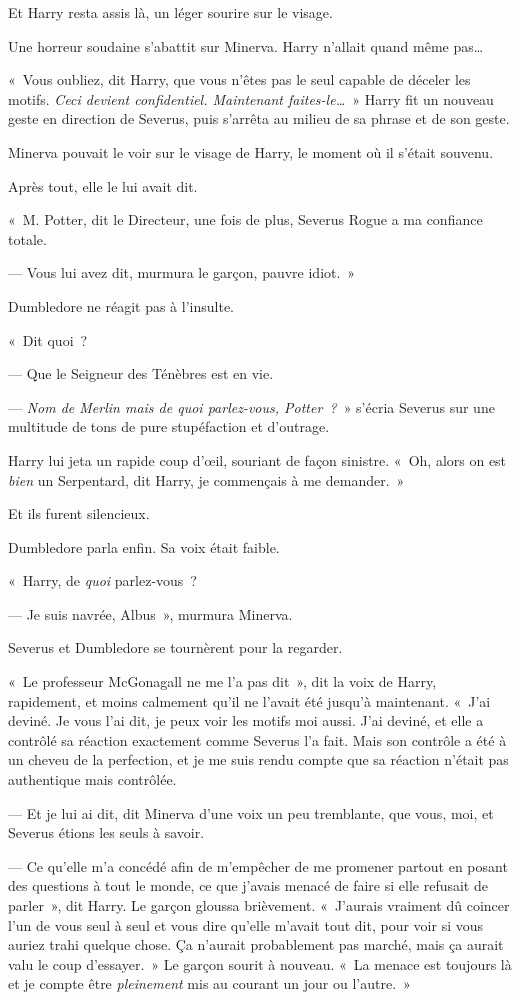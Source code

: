 Et Harry resta assis là, un léger sourire sur le visage.

Une horreur soudaine s'abattit sur Minerva.
Harry n'allait quand même pas…

«~Vous oubliez, dit Harry, que vous n'êtes pas le seul capable de déceler les motifs.
\emph{Ceci devient confidentiel.
Maintenant faites-le…}~» Harry fit un nouveau geste en direction de Severus, puis s'arrêta au milieu de sa phrase et de son geste.

Minerva pouvait le voir sur le visage de Harry, le moment où il s'était souvenu.

Après tout, elle le lui avait dit.

«~M. Potter, dit le Directeur, une fois de plus, Severus Rogue a ma confiance totale.

--- Vous lui avez dit, murmura le garçon, pauvre idiot.~»

Dumbledore ne réagit pas à l'insulte.

«~Dit quoi~?

--- Que le Seigneur des Ténèbres est en vie.

--- \emph{Nom de Merlin mais de quoi parlez-vous, Potter~?}~» s'écria Severus sur une multitude de tons de pure stupéfaction et d'outrage.

Harry lui jeta un rapide coup d'œil, souriant de façon sinistre.
«~Oh, alors on est \emph{bien} un Serpentard, dit Harry, je commençais à me demander.~»

Et ils furent silencieux.

Dumbledore parla enfin.
Sa voix était faible.

«~Harry, de \emph{quoi} parlez-vous~?

--- Je suis navrée, Albus~», murmura Minerva.

Severus et Dumbledore se tournèrent pour la regarder.

«~Le professeur McGonagall ne me l'a pas dit~», dit la voix de Harry, rapidement, et moins calmement qu'il ne l'avait été jusqu'à maintenant.
«~J'ai deviné.
Je vous l'ai dit, je peux voir les motifs moi aussi.
J'ai deviné, et elle a contrôlé sa réaction exactement comme Severus l'a fait.
Mais son contrôle a été à un cheveu de la perfection, et je me suis rendu compte que sa réaction n'était pas authentique mais contrôlée.

--- Et je lui ai dit, dit Minerva d'une voix un peu tremblante, que vous, moi, et Severus étions les seuls à savoir.

--- Ce qu'elle m'a concédé afin de m'empêcher de me promener partout en posant des questions à tout le monde, ce que j'avais menacé de faire si elle refusait de parler~», dit Harry.
Le garçon gloussa brièvement.
«~J'aurais vraiment dû coincer l'un de vous seul à seul et vous dire qu'elle m'avait tout dit, pour voir si vous auriez trahi quelque chose.
Ça n'aurait probablement pas marché, mais ça aurait valu le coup d'essayer.~»
Le garçon sourit à nouveau.
«~La menace est toujours là et je compte être \emph{pleinement} mis au courant un jour ou l'autre.~»

